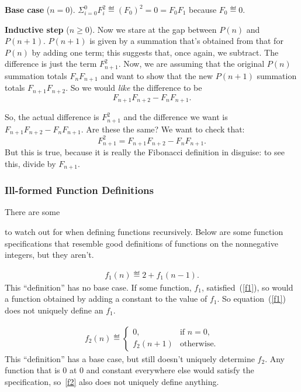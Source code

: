 \begin{definition}
\textbf{Base case} ($n=0$). 
$\Sigma_{i=0}^0 F_i^2 \eqdef (F_0)^2 = 0 = F_0 F_1$ because
$F_0 \eqdef 0$.

\textbf{Inductive step} ($n\geq 0$).  Now we stare at the gap between
$P(n)$ and $P(n+1)$.  $P(n+1)$ is given by a summation that's obtained
from that for $P(n)$ by adding one term; this suggests that, once again,
we subtract.  The difference is just the term $F_{n+1}^2$.  Now, we are
assuming that the original $P(n)$ summation totals $F_n F_{n+1}$ and want
to show that the new $P(n+1)$ summation totals $F_{n+1} F_{n+2}$.  So we
would {\em like\/} the difference to be
\[
F_{n+1} F_{n+2} - F_n F_{n+1}.
\]

So, the actual difference is $F_{n+1}^2$ and the difference we want is
$F_{n+1} F_{n+2} - F_n F_{n+1}$.  Are these the same?  We want to check
that:
\[
F_{n+1}^2 = F_{n+1} F_{n+2} - F_n F_{n+1}.
\]
But this is true, because it is really the Fibonacci definition in
disguise: to see this, divide by $F_{n+1}$.
\fi



\subsubsection{Ill-formed Function Definitions}

There are some  to watch out for when
defining functions recursively.  Below are some function specifications
that resemble good definitions of functions on the nonnegative integers,
but they aren't.

\begin{eqnarray}\label{f1}
f_1(n)\eqdef 2+f_1(n-1).
\end{eqnarray}
This ``definition'' has no base case.  If some function, $f_1$,
satisfied~(\ref{f1}), so would a function obtained by adding a constant to
the value of $f_1$.  So equation~(\ref{f1}) does not uniquely define
an $f_1$.

\begin{eqnarray}\label{f2}
f_2(n) \eqdef
\begin{cases}
 0, & \text{if $n=0$},\\
 f_2(n+1) &  \text{otherwise}.
\end{cases}
\end{eqnarray}
This ``definition'' has a base case, but still doesn't uniquely determine
$f_2$.  Any function that is 0 at 0 and constant everywhere else would
satisfy the specification, so~\eqref{f2} also does not uniquely define
anything.


\end{definition}
